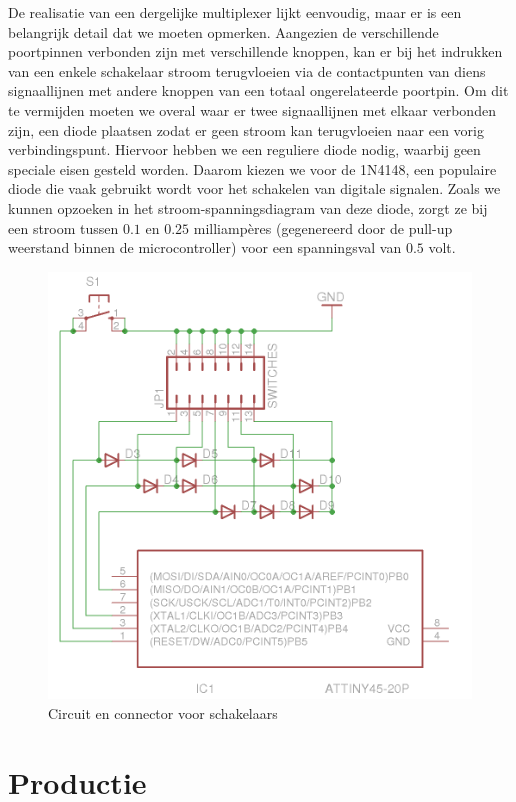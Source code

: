 De realisatie van een dergelijke multiplexer lijkt eenvoudig, maar er is een belangrijk detail dat we moeten opmerken. Aangezien de verschillende poortpinnen verbonden zijn met verschillende knoppen, kan er bij het indrukken van een enkele schakelaar stroom terugvloeien via de contactpunten van diens signaallijnen met andere knoppen van een totaal ongerelateerde poortpin. Om dit te vermijden moeten we overal waar er twee signaallijnen met elkaar verbonden zijn, een diode plaatsen zodat er geen stroom kan terugvloeien naar een vorig verbindingspunt. Hiervoor hebben we een reguliere diode nodig, waarbij geen speciale eisen gesteld worden. Daarom kiezen we voor de 1N4148, een populaire diode die vaak gebruikt wordt voor het schakelen van digitale signalen. Zoals we kunnen opzoeken in het stroom-spanningsdiagram van deze diode, zorgt ze bij een stroom tussen $0.1$ en $0.25$ milliampères (gegenereerd door de pull-up weerstand binnen de microcontroller) voor een spanningsval van $0.5$ volt.

\begin{figure}
	\includegraphics[width=\textwidth]{afbeeldingen/inputmodule_schakelaars}
	\caption{Circuit en connector voor schakelaars}
\end{figure}

\section{Productie}
\label{inputmodule:hardware:productie}

